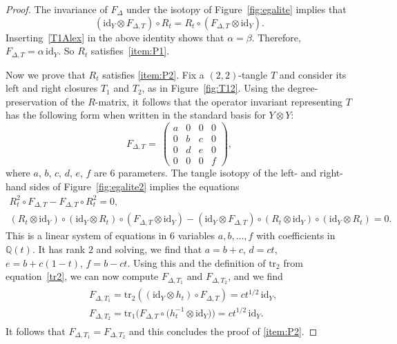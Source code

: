 \documentclass[10pt,a4paper]{amsart}
\numberwithin{equation}{section}
\theoremstyle{definition}
\begin{document}
\begin{proof}
The invariance of $F_\Delta$ under the isotopy of
Figure~\ref{fig:egalite} implies that
\begin{equation*}
(\mathrm{id}_Y \otimes F_{\Delta,T}) \circ R_{t} =
R_{t} \circ (F_{\Delta,T} \otimes \mathrm{id}_Y) .
\end{equation*}
Inserting~\eqref{T1Alex} in the above identity shows that $\alpha = \beta$. Therefore,
$ F_{\Delta,T} = \alpha\,\mathrm{id}_Y$. So $R_{t}$ satisfies~\eqref{item:P1}.

Now we prove that $R_{t}$ satisfies \eqref{item:P2}. Fix a $(2,2)$-tangle $T$
and consider its left and right closures $T_1$ and $T_2$, as in
Figure~\ref{fig:T12}. Using the degree-preservation of the $R$-matrix, it follows
that the operator invariant representing $T$ has the following form when
written in the standard basis for $Y \otimes Y$:
\[
F_{\Delta,T}=~\begin{pmatrix}
a & 0 & 0 & 0 \\
0 & b & c & 0 \\
0 & d & e & 0 \\
0 & 0 & 0 & f
\end{pmatrix},
\]
where $a$, $b$, $c$, $d$, $e$, $f$ are $6$ parameters. The tangle isotopy of
the left- and right-hand sides of Figure~\ref{fig:egalite2} implies the equations
\begin{gather*}%
 R_t^2 \circ F_{\Delta,T} - F_{\Delta,T} \circ R_t^2 = 0 ,\\
 (R_t \otimes \text{id}_Y) \circ (\text{id}_Y \otimes R_t) \circ
( F_{\Delta,T} \otimes \text{id}_Y) - (\text{id}_Y \otimes F_{\Delta,T})
\circ (R_t \otimes \text{id}_Y) \circ (\text{id}_Y \otimes R_t) = 0 .
\end{gather*}
This is a linear system of equations in $6$ variables $a,b,\dots,f$ with
coefficients in $\mathbb{Q}(t)$. It has rank $2$ and solving, we find that
$a = b + c$, $d = c t$, $e = b + c (1-t)$, $f = b - c t$.
Using this and the definition of $\mathrm{tr}_2$ from equation~\eqref{tr2}, we can now
compute $F_{\Delta,T_1}$ and $F_{\Delta,T_2}$, and we find
\begin{gather*}
\begin{split}
& F_{\Delta,T_1} =
 \mathrm{tr}_{2} ((\mathrm{id}_Y \otimes h_t) \circ F_{\Delta,T})
= c t^{1/2}\,\mathrm{id}_Y, \\
& F_{\Delta,T_2} = \mathrm{tr}_{1} \bigl(F_{\Delta,T}
\circ \bigl(h_t^{-1} \otimes \mathrm{id}_Y\bigr)\bigr) = c t^{1/2}\,\mathrm{id}_Y.
\end{split}
\end{gather*}
It follows that $F_{\Delta,T_1}=F_{\Delta,T_2}$ and this
concludes the proof of \eqref{item:P2}.
\end{proof}
\end{document}
